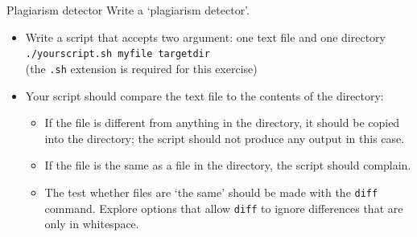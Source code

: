 \documentclass[11pt,headernav]{beamer}
\begin{document}





\begin{exerciseframe}{Plagiarism detector}
  \label{sl-lnx:plag}
  Write a `plagiarism detector'.
  \begin{itemize}
  \item Write a script that accepts two argument: one text file and one directory\\
    \lstinline{./yourscript.sh myfile targetdir}\\
    (the \lstinline{.sh} extension is required for this exercise)
  \item Your script should compare the text file to the contents of the directory:
    \begin{itemize}
    \item If the file is different from anything in the directory, it
      should be copied into the directory;
      the script should not produce any output in this case.
    \item If the file is the same as a file in the directory,
      the script should complain.
    \item The test whether files are `the same' should be made with the \lstinline{diff}
      command. Explore options that allow \lstinline{diff} to ignore differences that
      are only in whitespace.
    \end{itemize}
  \end{itemize}
\end{exerciseframe}
\end{document}
